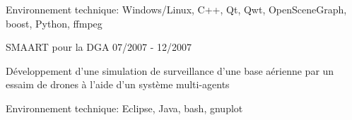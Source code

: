\begin{cventries}
{\begin{cvitems}
		\item {Environnement technique: Windows/Linux, C++, Qt, Qwt, OpenSceneGraph, 
			boost, Python, ffmpeg}
      \end{cvitems}
    }
  \cventry
    {SMAART pour la DGA}
    {}
    {}
    {07/2007 - 12/2007}
    {
      \begin{cvitems}
        \item {Développement d'une simulation de surveillance d’une base 
			   aérienne par un essaim de drones à l’aide d’un système 
			   multi-agents}
        \item {Environnement technique: Eclipse, Java, bash, gnuplot}
      \end{cvitems}
    }
\end{cventries}

